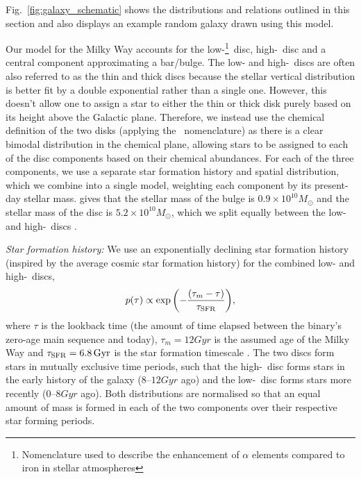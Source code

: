 Fig.~\ref{fig:galaxy_schematic} shows the distributions and relations outlined in this section and also displays an example random galaxy drawn using this model.

Our model for the Milky Way accounts for the low-\achem\footnote{Nomenclature used to describe the enhancement of $\alpha$ elements compared to iron in stellar atmospheres}~disc, high-\achem~disc and a central component approximating a bar/bulge. The low- and high-\achem~discs are often also referred to as the thin and thick discs because the stellar vertical distribution is better fit by a double exponential rather than a single one. However, this doesn't allow one to assign a star to either the thin or thick disk purely based on its height above the Galactic plane. Therefore, we instead use the chemical definition of the two disks (applying the \achem~nomenclature) as there is a clear bimodal distribution in the chemical plane, allowing stars to be assigned to each of the disc components based on their chemical abundances. For each of the three components, we use a separate star formation history and spatial distribution, which we combine into a single model, weighting each component by its present-day stellar mass. \citet{Licquia+2015} gives that the stellar mass of the bulge is $0.9 \times 10^{10} \unit{M_{\odot}}$ and the stellar mass of the disc is $5.2 \times 10^{10} \unit{M_\odot}$, which we split equally between the low- and high-\achem~discs \citep[e.g.,][]{Snaith+2014}.

\textit{Star formation history:} 
We use an exponentially declining star formation history \citep{Frankel+2018} (inspired by the average cosmic star formation history) for the combined low- and high-\achem~discs,
\begin{equation}\label{eq:thin_disc_tau}
    p(\tau) \propto \exp \qty(-\frac{(\tau_m - \tau)}{\tau_{\rm SFR}}),
\end{equation}
where $\tau$ is the lookback time (the amount of time elapsed between the binary's zero-age main sequence and today), $\tau_m = 12 \unit{Gyr}$ is the assumed age of the Milky Way and $\tau_{\rm SFR} = 6.8 \unit{Gyr}$ is the star formation timescale \citep{Frankel+2018}. The two discs form stars in mutually exclusive time periods, such that the high-\achem~disc forms stars in the early history of the galaxy ($8$--$12 \unit{Gyr}$ ago) and the low-\achem~disc forms stars more recently ($0$--$8 \unit{Gyr}$ ago). Both distributions are normalised so that an equal amount of mass is formed in each of the two components over their respective star forming periods.

